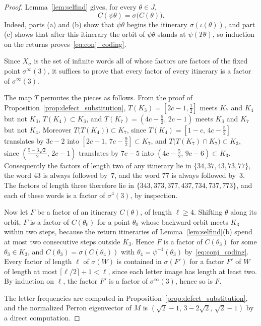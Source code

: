 \documentclass{birkjour}
\theoremstyle{definition}
\theoremstyle{remark}
\begin{document}
\begin{proof}
Lemma~\ref{lem:selfind} gives, for every $\theta\in J$,
\begin{equation}\label{eq:conj_coding}
  C(\psi\theta)=\sigma\bigl(C(\theta)\bigr).
\end{equation}
Indeed, parts (a) and (b) show that $\psi\theta$ begins the
itinerary $\sigma(\iota(\theta))$, and part (c) shows that
after this itinerary the orbit of $\psi\theta$ stands at
$\psi(T\theta)$, so induction on the returns
proves~\eqref{eq:conj_coding}.

Since $X_{\sigma}$ is the set of infinite words all of whose
factors are factors of the fixed point
$\sigma^{\infty}(3)$, it suffices to prove that every factor
of every itinerary is a factor of $\sigma^{\infty}(3)$.

The map $T$ permutes the pieces as follows. From the proof
of Proposition~\ref{prop:defect_substitution},
$T(K_{3})=[2c-1,\tfrac12]$ meets $K_{7}$ and $K_{4}$ but not
$K_{3}$, $T(K_{4})\subset K_{3}$, and
$T(K_{7})=(4c-\tfrac52,\,2c-1)$ meets $K_{3}$ and $K_{7}$
but not $K_{4}$. Moreover
$T\bigl(T(K_{4})\bigr)\subset K_{7}$, since
$T(K_{4})=[1-c,\,4c-\tfrac52]$ translates by $3c-2$ into
$[2c-1,\,7c-\tfrac92]\subset K_{7}$, and
$T\bigl(T(K_{7})\cap K_{7}\bigr)\subset K_{3}$, since
$(\tfrac{5-3\sqrt{2}}{2},\,2c-1)$ translates by $7c-5$ into
$(4c-\tfrac52,\,9c-6)\subset K_{3}$. Consequently the
factors of length two of any itinerary lie in
$\{34,37,43,73,77\}$, the word $43$ is always followed
by~$7$, and the word $77$ is always followed by~$3$. The
factors of length three therefore lie in
$\{343,373,377,437,734,737,773\}$, and each of these words
is a factor of $\sigma^{4}(3)$, by inspection.

Now let $F$ be a factor of an itinerary $C(\theta)$, of
length $\ell\ge 4$. Shifting $\theta$ along its orbit, $F$
is a factor of $C(\theta_{0})$ for a point $\theta_{0}$
whose backward orbit meets $K_{3}$ within two steps, because
the return itineraries of Lemma~\ref{lem:selfind}(b) spend
at most two consecutive steps outside $K_{3}$. Hence $F$ is
a factor of $C(\theta_{3})$ for some $\theta_{3}\in K_{3}$,
and $C(\theta_{3})=\sigma(C(\theta_{4}))$ with
$\theta_{4}=\psi^{-1}(\theta_{3})$
by~\eqref{eq:conj_coding}. Every factor of length $\ell$ of
$\sigma(W)$ is contained in $\sigma(F')$ for a factor $F'$
of $W$ of length at most $\lceil\ell/2\rceil+1<\ell$, since
each letter image has length at least two. By induction on
$\ell$, the factor $F'$ is a factor of
$\sigma^{\infty}(3)$, hence so is $F$.

The letter frequencies are computed in
Proposition~\ref{prop:defect_substitution}, and the
normalized Perron eigenvector of $M$ is
$(\sqrt{2}-1,\,3-2\sqrt{2},\,\sqrt{2}-1)$ by a direct
computation.
\end{proof}
\end{document}
